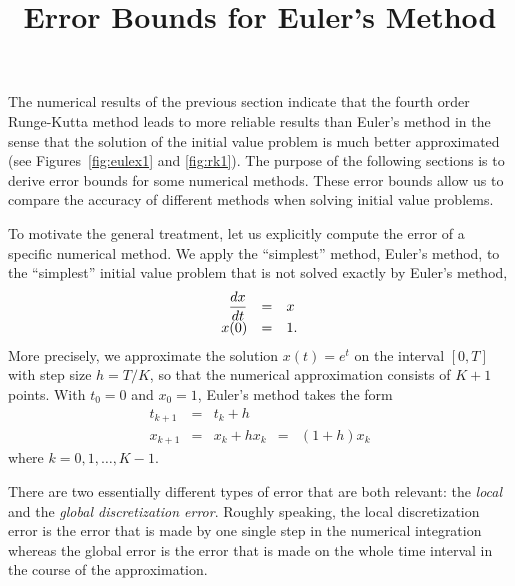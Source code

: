 \documentclass{ximera}
\title{Error Bounds for Euler's Method}
\begin{document}
\begin{abstract}
\end{abstract}
\maketitle


\label{sec:EEEM}

The numerical results of the previous section indicate that the 
fourth order Runge-Kutta method leads to more reliable results than 
Euler's method in the sense that the solution of the initial value 
problem  is much better approximated 
(see Figures~\ref{fig:eulex1} 
and \ref{fig:rk1}).  The purpose of the following sections
is to derive error bounds 
for some numerical methods. These error 
bounds allow us to compare the accuracy of different methods 
when solving initial value problems.

To motivate the general treatment, let us explicitly compute
the error of a specific numerical method. We apply the ``simplest'' 
method, Euler's method, to the ``simplest'' 
initial value problem
that is not solved exactly by Euler's method,
\begin{equation} \label{eq:simplest}
\begin{array}{rcl}
\displaystyle\frac{dx}{dt} & = & x \\
x(0) & = & 1.
\end{array}
\end{equation}
More precisely, we approximate the solution $x(t)=e^t$
on the interval $[0,T]$ with step size $h=T/K$, so 
that the numerical approximation consists of $K+1$ points.  
With $t_0=0$ and $x_0=1$, 
Euler's method   takes the form 
\[
\begin{array}{rclcl}
t_{k+1} & = & t_k+h & & \\
x_{k+1} & = & x_k + h x_k & = & (1+h)x_k
\end{array}
\]
where $k=0,1,\ldots,K-1$.

There are two essentially different types of error that are
both relevant: the {\em local\/} and the {\em global discretization 
error}.
Roughly speaking, the local discretization error is the error
that is made by one single step in the numerical integration whereas the
global error is the error that is made on the whole time interval
in the course of the approximation.  
\end{document}
